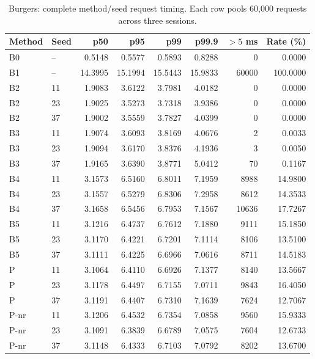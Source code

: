 \begin{table}[ht]
\centering\small
\caption{Burgers: complete method/seed request timing. Each row pools 60,000 requests across three sessions.}
\begin{tabular}{@{}llrrrrrr@{}}\toprule
Method & Seed & p50 & p95 & p99 & p99.9 & $>5$ ms & Rate (\%)\\\midrule
B0 & -- & 0.5148 & 0.5577 & 0.5893 & 0.8288 & 0 & 0.0000\\
B1 & -- & 14.3995 & 15.1994 & 15.5443 & 15.9833 & 60000 & 100.0000\\
B2 & 11 & 1.9083 & 3.6122 & 3.7981 & 4.0182 & 0 & 0.0000\\
B2 & 23 & 1.9025 & 3.5273 & 3.7318 & 3.9386 & 0 & 0.0000\\
B2 & 37 & 1.9002 & 3.5559 & 3.7827 & 4.0399 & 0 & 0.0000\\
B3 & 11 & 1.9074 & 3.6093 & 3.8169 & 4.0676 & 2 & 0.0033\\
B3 & 23 & 1.9094 & 3.6170 & 3.8376 & 4.1936 & 3 & 0.0050\\
B3 & 37 & 1.9165 & 3.6390 & 3.8771 & 5.0412 & 70 & 0.1167\\
B4 & 11 & 3.1573 & 6.5160 & 6.8011 & 7.1959 & 8988 & 14.9800\\
B4 & 23 & 3.1557 & 6.5279 & 6.8306 & 7.2958 & 8612 & 14.3533\\
B4 & 37 & 3.1658 & 6.5456 & 6.7953 & 7.1567 & 10636 & 17.7267\\
B5 & 11 & 3.1216 & 6.4737 & 6.7612 & 7.1880 & 9111 & 15.1850\\
B5 & 23 & 3.1170 & 6.4221 & 6.7201 & 7.1114 & 8106 & 13.5100\\
B5 & 37 & 3.1111 & 6.4225 & 6.6966 & 7.0616 & 8711 & 14.5183\\
P & 11 & 3.1064 & 6.4110 & 6.6926 & 7.1377 & 8140 & 13.5667\\
P & 23 & 3.1178 & 6.4497 & 6.7155 & 7.0711 & 9843 & 16.4050\\
P & 37 & 3.1191 & 6.4407 & 6.7310 & 7.1639 & 7624 & 12.7067\\
P-nr & 11 & 3.1206 & 6.4532 & 6.7354 & 7.0858 & 9560 & 15.9333\\
P-nr & 23 & 3.1091 & 6.3839 & 6.6789 & 7.0575 & 7604 & 12.6733\\
P-nr & 37 & 3.1148 & 6.4333 & 6.7103 & 7.0792 & 8202 & 13.6700\\
\bottomrule\end{tabular}
\end{table}
\clearpage

